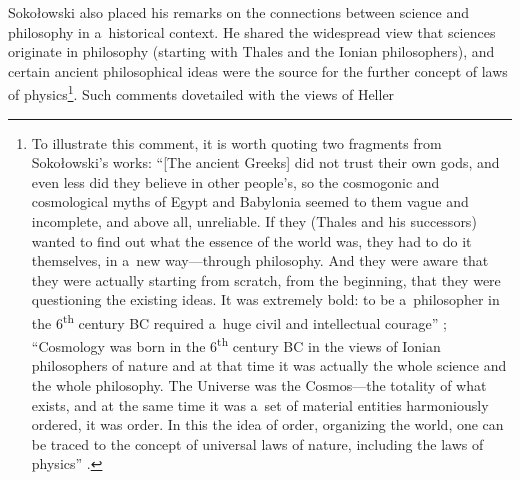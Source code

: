 \documentclass[%
  manuscript=article,
  year=2024,
  volume=77,
  doi=00000.000,
]{zfn}
\begin{document}
Sokołowski also placed his remarks on the connections between science and philosophy in a~historical context. He shared the widespread view that sciences originate in philosophy (starting with Thales and the Ionian philosophers), and certain ancient philosophical ideas were the source for the further concept of laws of physics\footnote{To illustrate this comment, it is worth quoting two fragments from Sokołowski's works:
``[The ancient Greeks] did not trust their own gods, and even less did they believe in other people's, so the cosmogonic and cosmological myths of Egypt and Babylonia seemed to them vague and incomplete, and above all, unreliable. If they (Thales and his successors) wanted to find out what the essence of the world was, they had to do it themselves, in a~new way---through philosophy. And they were aware that they were actually starting from scratch, from the beginning, that they were questioning the existing ideas. It was extremely bold: to be a~philosopher in the 6\textsuperscript{th} century BC required a~huge civil and intellectual courage''
\parencite[][p.44]{Sokoowski1989Gos};%
``Cosmology was born in the 6\textsuperscript{th} century BC in the views of Ionian philosophers of nature and at that time it was actually the whole science and the whole philosophy. The Universe was the Cosmos---the totality of what exists, and at the same time it was a~set of material entities harmoniously ordered, it was order. In this the idea of order, organizing the world, one can be traced to the concept of universal laws of nature, including the laws of physics''
\parencite[][p.28]{Sokoowski2015Granice}.%
}. Such comments dovetailed with the views of Heller 
\end{document}
